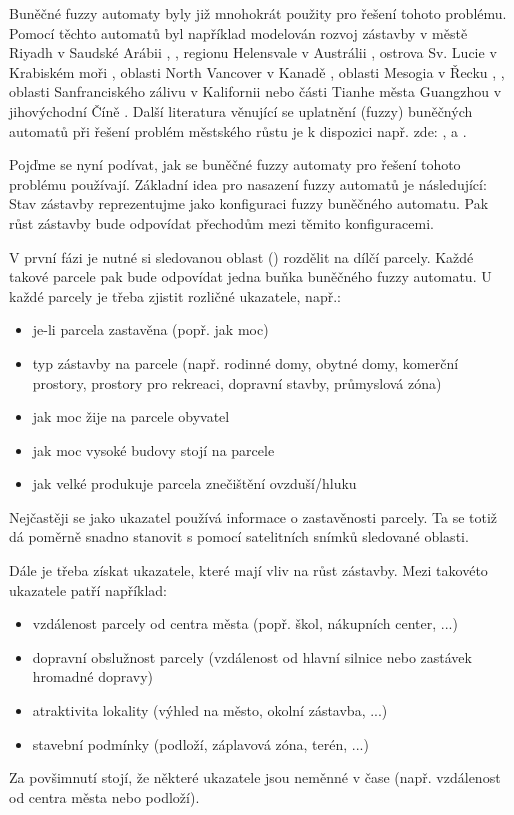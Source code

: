 \documentclass[a4paper,10pt]{article}
\begin{document}
Buněčné fuzzy automaty byly již mnohokrát použity pro řešení tohoto problému. Pomocí těchto automatů byl například modelován rozvoj zástavby v městě Riyadh v Saudské Arábii \cite{AlAhHep+-ModUrbGroDynUsCelAutGIS}, \cite{Ahm+-CalFuzCelAutModUrbDynSauAr}, regionu Helensvale v Austrálii \cite{War+-StoConCelModUrbGro}, ostrova Sv. Lucie v Krabiském moři \cite{WhiEng-CelAutBasIntDynRegMod}, oblasti North Vancover v Kanadě \cite{LaiDraSch-IntMulEvCelAutMetLanSimMod}, oblasti Mesogia v Řecku \cite{ManHatPra-FuzCelAutBasSheModUrGro+}, \cite{ManHatPra-ModUrbGroUsFuzCelAut}, oblasti Sanfranciského zálivu v Kalifornii \cite{ClaHopHay-SelModCelAutModHistUrbSanFraBayAre} nebo části Tianhe města Guangzhou v jihovýchodní Číně \cite{Wu-CalStoCelAutAppRurUrbLanConv}. %
%
Další literatura věnující se uplatnění (fuzzy) buněčných automatů při řešení problém městského růstu je k dispozici např. zde: \cite{PowSimWhi-HieFuzzPattMatcRegCompLanUseMap}, \cite{Dra-CouFuzSetTheGisBaCelAutLanUseChaMod} a \cite{LiuPhi-DevCelAutModUrbGroIncFuzSetApp}.

Pojďme se nyní podívat, jak se buněčné fuzzy automaty pro řešení tohoto problému používají. Základní idea pro nasazení fuzzy automatů je následující: Stav zástavby reprezentujme jako konfiguraci fuzzy buněčného automatu. Pak růst zástavby bude odpovídat přechodům mezi těmito konfiguracemi.

V první fázi je nutné si sledovanou oblast () rozdělit na dílčí parcely. Každé takové parcele pak bude odpovídat jedna buňka buněčného fuzzy automatu. U každé parcely je třeba zjistit rozličné ukazatele, např.:
\begin{itemize}
 \item je-li parcela zastavěna (popř. jak moc)
 \item typ zástavby na parcele (např. rodinné domy, obytné domy, komerční prostory, prostory pro rekreaci, dopravní stavby, průmyslová zóna)
 \item jak moc žije na parcele obyvatel
 \item jak moc vysoké budovy stojí na parcele
 \item jak velké produkuje parcela znečištění ovzduší/hluku
\end{itemize}
Nejčastěji se jako ukazatel používá informace o zastavěnosti parcely. Ta se totiž dá poměrně snadno stanovit s pomocí satelitních snímků sledované oblasti.

Dále je třeba získat ukazatele, které mají vliv na růst zástavby. Mezi takovéto ukazatele patří například:
\begin{itemize}
 \item vzdálenost parcely od centra města (popř. škol, nákupních center, ...)
 \item dopravní obslužnost parcely (vzdálenost od hlavní silnice nebo zastávek hromadné dopravy)
 \item atraktivita lokality (výhled na město, okolní zástavba, ...)
 \item stavební podmínky (podloží, záplavová zóna, terén, ...)
\end{itemize}
Za povšimnutí stojí, že některé ukazatele jsou neměnné v čase (např. vzdálenost od centra města nebo podloží).
\end{document}
